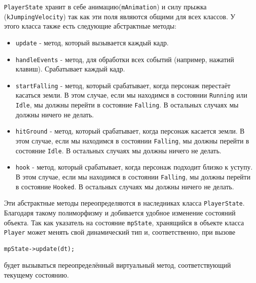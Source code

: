\documentclass{article}
\begin{document}
\begin{itemize}
\texttt{PlayerState} хранит в себе анимацию(\texttt{mAnimation}) и силу прыжка (\texttt{kJumpingVelocity}) так как эти поля являются общими для всех классов. У этого класса также есть следующие абстрактные методы:

\begin{itemize}
\item \texttt{update} - метод, который вызывается каждый кадр.
\item \texttt{handleEvents} - метод, для обработки всех событий (например, нажатий клавиш). Срабатывает каждый кадр.

\item \texttt{startFalling} - метод, который срабатывает, когда персонаж перестаёт касаться земли. В этом случае, если мы находимся в состоянии \texttt{Running} или \texttt{Idle}, мы должны перейти в состояние \texttt{Falling}. В остальных случаях мы должны ничего не делать.
\item \texttt{hitGround} - метод, который срабатывает, когда персонаж касается земли. В этом случае, если мы находимся в состоянии \texttt{Falling}, мы должны перейти в состояние \texttt{Idle}. В остальных случаях мы должны ничего не делать.
\item \texttt{hook} - метод, который срабатывает, когда персонаж подходит близко к уступу. В этом случае, если мы находимся в состоянии \texttt{Falling}, мы должны перейти в состояние \texttt{Hooked}. В остальных случаях мы должны ничего не делать.
\end{itemize}

Эти абстрактные методы переопределяются в наследниках класса \texttt{PlayerState}. Благодаря такому полиморфизму и добивается удобное изменение состояний объекта. Так как указатель на состояние \texttt{mpState}, хранящийся в объекте класса \texttt{Player} может менять свой динамический тип и, соответственно, при вызове
\begin{lstlisting}
mpState->update(dt);
\end{lstlisting}
будет вызываться переопределённый виртуальный метод, соответствующий текущему состоянию.


\end{itemize}
\end{document}
